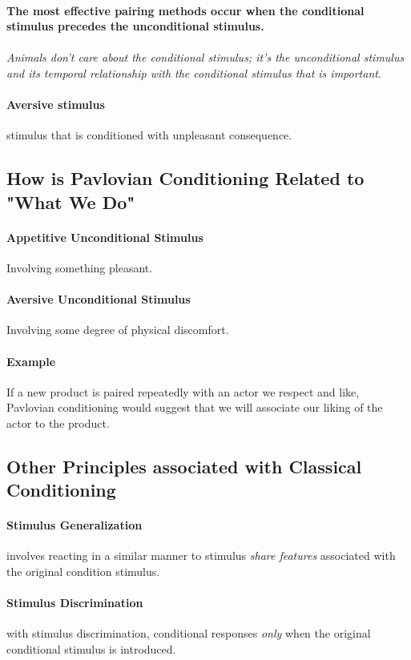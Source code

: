 \documentclass{article}
\begin{document}
	\paragraph{}\textbf{The most effective pairing methods occur when the conditional stimulus precedes the unconditional stimulus.}
	\paragraph{} \emph{Animals don't care about the conditional stimulus; it's the unconditional stimulus and its temporal relationship with the conditional stimulus that is important}.
	\paragraph{Aversive stimulus} stimulus that is conditioned with unpleasant consequence.
	\subsection{How is Pavlovian Conditioning Related to "What We Do"}
	\paragraph{Appetitive Unconditional Stimulus} Involving something pleasant.
	\paragraph{Aversive Unconditional Stimulus} Involving some degree of physical discomfort.
	\paragraph{Example} If a new product is paired repeatedly with an actor we respect and like, Pavlovian conditioning would suggest that we will associate our liking of the actor to the product.
	\subsection{Other Principles associated with Classical Conditioning}
	\paragraph{Stimulus Generalization} involves reacting in a similar manner to stimulus \emph{share features} associated with the original condition stimulus.
	\paragraph{Stimulus Discrimination} with stimulus discrimination, conditional responses \emph{only} when the original conditional stimulus is introduced. 
\end{document}
